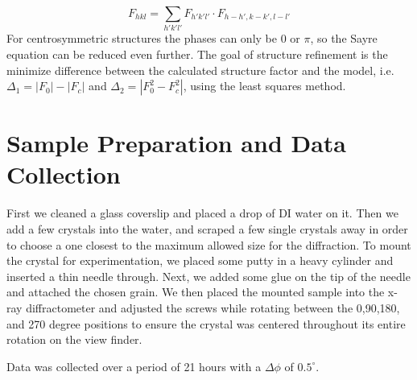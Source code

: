 \documentclass[]{scrartcl}
\begin{document}
\begin{equation}
\label{sayre}
F_{hkl} = \sum_{h'k'l'} F_{h'k'l'} \cdot F_{h-h',k-k',l-l'}
\end{equation}
For centrosymmetric structures the phases can only be 0 or $ \pi $, so the Sayre equation can be reduced even further. The goal of structure refinement is the minimize difference between the calculated structure factor and the model, i.e. $ \Delta_1 = |F_0|-|F_c| $ and $ \Delta_2 = | F_{0}^2 - F_{c}^2 |$, using the least squares method.


\section{Sample Preparation and Data Collection}
First we cleaned a glass coverslip and placed a drop of DI water on it. Then we add a few crystals into the water, and scraped a few single crystals away in order to choose a one closest to the maximum allowed size for the diffraction. To mount the crystal for experimentation, we placed some putty in a heavy cylinder and inserted a thin needle through. Next, we added some glue on the tip of the needle and attached the chosen grain. We then placed the mounted sample into the x-ray diffractometer and adjusted the screws while rotating between the 0,90,180, and 270 degree positions to ensure the crystal was centered throughout its entire rotation on the view finder. 

Data was collected over a period of 21 hours with a $ \Delta\phi $ of $0.5^{\circ} $.

%
%
%
\end{document}

